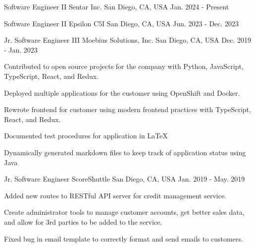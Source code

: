 

\begin{cventries}

	\cventry
	{Software Engineer II} %
	{Sentar Inc.} %
	{San Diego, CA, USA} %
	{Jan. 2024 - Present} %
	{}

	\cventry
	{Software Engineer II} %
	{Epsilon C5I} %
	{San Diego, CA, USA} %
	{Jun. 2023 - Dec. 2023} %
	{}

	\cventry
	{Jr. Software Engineer III} %
	{Moebius Solutions, Inc.} %
	{San Diego, CA, USA} %
	{Dec. 2019 - Jan. 2023} %
	{
		\begin{cvitems} %
			\item {Contributed to open source projects for the company with Python, JavaScript, TypeScript, React, and Redux.}
			\item {Deployed multiple applications for the customer using OpenShift and Docker.}
			\item {Rewrote frontend for customer using modern frontend practices with TypeScript, React, and Redux.}
			\item {Documented test procedures for application in LaTeX}
			\item {Dynamically generated markdown files to keep track of application status using Java}
		\end{cvitems}
	}

	\cventry
	{Jr. Software Engineer} %
	{ScoreShuttle} %
	{San Diego, CA, USA} %
	{Jan. 2019 - May. 2019} %
	{
		\begin{cvitems} %
			\item {Added new routes to RESTful API server for credit management service.}
			\item {Create administrator tools to manage customer accounts, get better sales data, and allow for 3rd parties to be added to the service.}
			\item {Fixed bug in email template to correctly format and send emails to customers.}
		\end{cvitems}
	}

\end{cventries}

